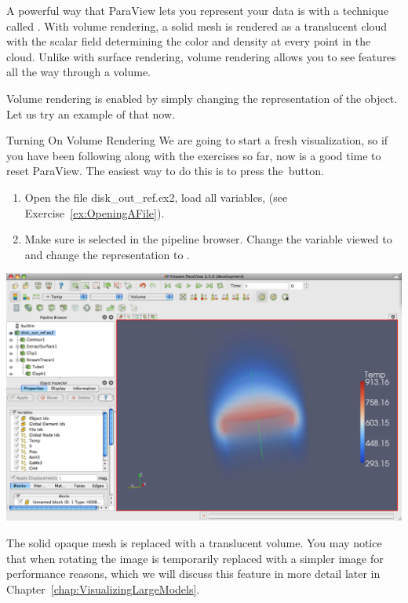 A powerful way that ParaView lets you represent your data is with a
technique called .  With volume rendering, a
solid mesh is rendered as a translucent cloud with the scalar field
determining the color and density at every point in the cloud.  Unlike with
surface rendering, volume rendering allows you to see features all the way
through a volume.

Volume rendering is enabled by simply changing the representation of the
object.  Let us try an example of that now.

\begin{exercise}{Turning On Volume Rendering}
  \label{ex:VolumeRendering}%
  We are going to start a fresh visualization, so if you have been
  following along with the exercises so far, now is a good time to reset
  ParaView.  The easiest way to do this is to press the~\disconnect button.

  \begin{enumerate}
  \item Open the file disk\_out\_ref.ex2, load all variables, \apply (see
    Exercise~\ref{ex:OpeningAFile}).
  \item Make sure  is selected in the pipeline
    browser.  Change the variable viewed to  and change the
    representation to .
  \end{enumerate}

  \begin{inlinefig}
    \includegraphics[width=\scw]{images/VolumeRender1}
  \end{inlinefig}

  The solid opaque mesh is replaced with a translucent volume. You may
  notice that when rotating the image is temporarily replaced with a
  simpler image for performance reasons, which we will discuss this feature
  in more detail later in Chapter~\ref{chap:VisualizingLargeModels}.
\end{exercise}

